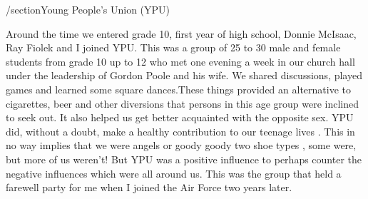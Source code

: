 /section{Young People's Union (YPU)}

Around the time we entered grade 10, first year of high school, Donnie McIsaac, Ray Fiolek and I joined YPU. This was a group of 25 to 30 male and female students from grade 10 up to 12 who met one evening a week in our church hall under the leadership of Gordon Poole and his wife. We shared discussions, played games and learned some square dances.These things provided an alternative to cigarettes, beer and other diversions that persons in this age group were inclined to seek out. It also helped us get better acquainted with the opposite sex. YPU did, without a doubt, make a healthy contribution to our teenage lives . This in no way implies that we were angels or goody goody two shoe types , some were, but more of us weren't! But YPU was a positive influence to perhaps counter the negative influences which were all around us. This was the group that held a farewell party for me when I joined the Air Force two years later.